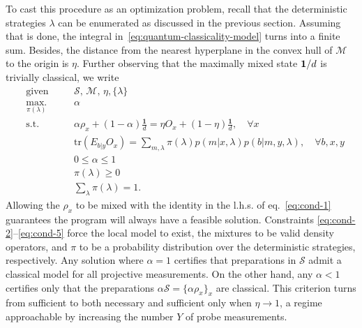         To cast this procedure as an optimization problem, recall that the deterministic strategies $\lambda$ can be enumerated as discussed in the previous section. Assuming that is done, the integral in~\eqref{eq:quantum-classicality-model} turns into a finite sum. Besides, the distance from the nearest hyperplane in the convex hull of $\mathcal{M}$ to the origin is $\eta$. Further observing that the maximally mixed state $\mathbf{1}/d$ is trivially classical, we write
        \begin{subequations}
            \begin{alignat}{2}
                &\text{given}    &\quad & \mathcal{S},\, \mathcal{M},\, \eta, \{ \lambda \} \\
                &\underset{\pi(\lambda)}{\text{max.}}   &	  & \alpha \\
                &\text{s.t.}    &      & \alpha \rho_x + (1 - \alpha)\frac{\mathbf{1}}{d} = \eta O_x + \left( 1 - \eta \right) \frac{\mathbf{1}}{d}, \quad\forall x \label{eq:cond-1}\\
                &                  &      & \text{tr}(E_{b \vert y} O_x) = \sum_{m, \lambda} \pi(\lambda) p(m \vert x, \lambda) p(b \vert m, y, \lambda), \quad\forall b, x, y \label{eq:cond-2}\\
                &				   &	  & 0 \leq \alpha \leq 1 \\
                &				   &	  & \pi(\lambda) \geq 0 \\
                &				   &	  & \sum_\lambda \pi(\lambda) = 1 \label{eq:cond-5}.
            \end{alignat}
            \label{eq:preparation-classicality-projective}
        \end{subequations}
        Allowing the $\rho_x$ to be mixed with the identity in the l.h.s. of eq.~\eqref{eq:cond-1} guarantees the program will always have a feasible solution. Constraints \eqref{eq:cond-2}--\eqref{eq:cond-5} force the local model to exist, the mixtures to be valid density operators, and $\pi$ to be a probability distribution over the deterministic strategies, respectively. Any solution where $\alpha = 1$ certifies that preparations in $\mathcal{S}$ admit a classical model for all projective measurements. On the other hand, any $\alpha < 1$ certifies only that the preparations $\alpha \mathcal{S} = \{ \alpha \rho_x \}_x$ are classical. This criterion turns from sufficient to both necessary and sufficient only when $\eta \rightarrow 1$, a regime approachable by increasing the number $Y$ of probe measurements.

